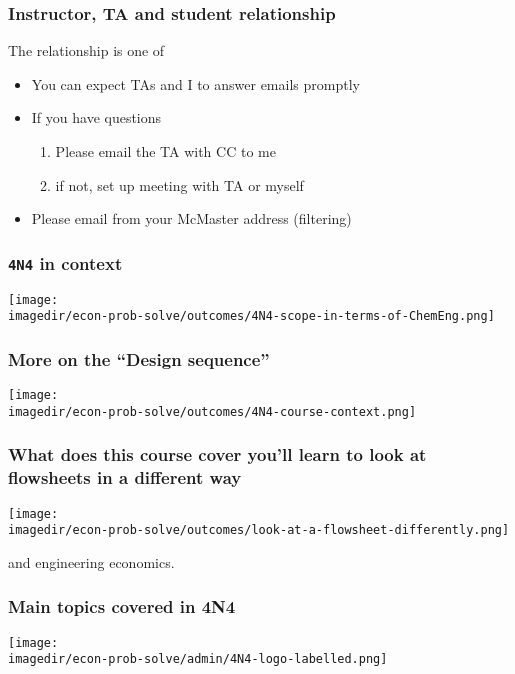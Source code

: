 \begin{frame}\frametitle{Instructor, TA and student relationship}
	\begin{exampleblock}{}
		The relationship is one of {}
	\end{exampleblock}
	
	\begin{itemize}
		\item	You can expect TAs and I to answer emails promptly
		\item	If you have questions
			\begin{enumerate}
				\item	Please email the TA with CC to me \hfill {\tiny{\color{myOrange}{$\longleftarrow$ hopefully this solves your problem}}}
				\item	if not, set up meeting with TA or myself
			\end{enumerate}
		\item	Please email from your McMaster address (filtering)
	\end{itemize}
\end{frame}

\begin{frame}\frametitle{\texttt{4N4} in context}
	\begin{center}
		\texttt{[image: \\imagedir/econ-prob-solve/outcomes/4N4-scope-in-terms-of-ChemEng.png]}
	\end{center}
\end{frame}

\begin{frame}\frametitle{More on the ``Design sequence''}
	\begin{center}
		\texttt{[image: \\imagedir/econ-prob-solve/outcomes/4N4-course-context.png]}
	\end{center}
\end{frame}

\begin{frame}\frametitle{What does this course cover {\scriptsize you'll learn to look at flowsheets in a different way}}
	\begin{center}
		\texttt{[image: \\imagedir/econ-prob-solve/outcomes/look-at-a-flowsheet-differently.png]}
	\end{center}
	and engineering economics.
\end{frame}

\begin{frame}\frametitle{Main topics covered in 4N4}
	\begin{center}
		\texttt{[image: \\imagedir/econ-prob-solve/admin/4N4-logo-labelled.png]}
	\end{center}
	\vspace{-12pt}
	{\small {\color{brown}{This is a unique course: not taught anywhere else in Canada.}}}
\end{frame}

